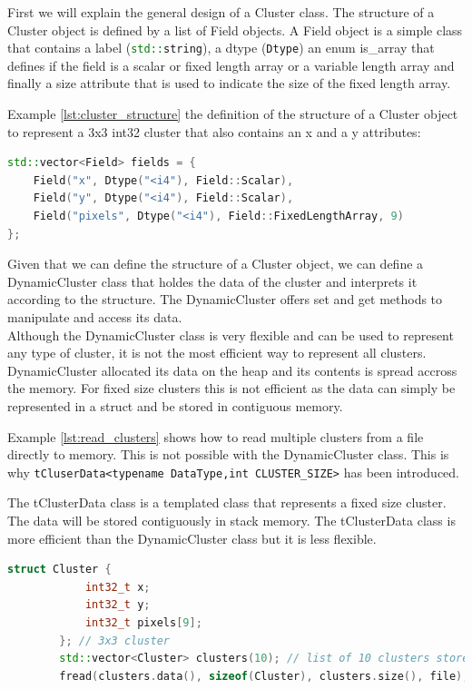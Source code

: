 \documentclass[./chapitre3.tex]{subfiles}
\begin{document}
First we will explain the general design of a Cluster class. The structure of a Cluster object is defined by a
list of Field objects. A Field object is a simple class that contains a label (\lstinline[language=C++]{std::string}), a
dtype (\lstinline[language=C++]{Dtype}) an enum is\_array that defines if the field is a scalar or fixed length array or a
variable length array and finally a size attribute that is used to indicate the size of the fixed length array.

Example \ref{lst:cluster_structure} the definition of the structure of a Cluster object to represent a 3x3 int32 cluster
that also contains an x and a y attributes:
\begin{lstlisting}[language=C++, caption={Example: Definition of a Cluster structure},label={lst:cluster_structure}]
std::vector<Field> fields = {
    Field("x", Dtype("<i4"), Field::Scalar),
    Field("y", Dtype("<i4"), Field::Scalar),
    Field("pixels", Dtype("<i4"), Field::FixedLengthArray, 9)
};
    \end{lstlisting}

Given that we can define the structure of a Cluster object, we can define a DynamicCluster class that holdes the data of the
cluster and interprets it according to the structure. The DynamicCluster offers set and get methods to manipulate and access
its data.\\

Although the DynamicCluster class is very flexible and can be used to represent any type of cluster, it is not the most efficient
way to represent all clusters. DynamicCluster allocated its data on the heap and its contents is spread accross the memory.
For fixed size clusters this is not efficient as the data can simply be represented in a struct and be stored in contiguous
memory.

Example \ref{lst:read_clusters} shows how to read multiple clusters from a file directly to memory. This is not possible
with the DynamicCluster class. This is why \lstinline|tCluserData<typename DataType,int CLUSTER_SIZE>| has been introduced.

The tClusterData class is a templated class that represents a fixed size cluster. The data will be stored contiguously in
stack memory. The tClusterData class is more efficient than the DynamicCluster class but it is less flexible.\\
\begin{lstlisting}[language=C++, caption={Example: Reading multiple clusters from a file},label={lst:read_clusters}]
        struct Cluster {
            int32_t x;
            int32_t y;
            int32_t pixels[9];
        }; // 3x3 cluster
        std::vector<Cluster> clusters(10); // list of 10 clusters stored contiguously in memory
        fread(clusters.data(), sizeof(Cluster), clusters.size(), file); // directly read 10 Clusters to memory
    \end{lstlisting}
\end{document}
